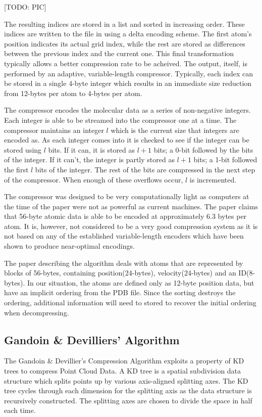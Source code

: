 \documentclass[a4paper,11pt]{report}
\begin{document}
[TODO: PIC] 

The resulting indices are stored in a list and sorted in increasing order. These indices are written to the file in using a delta encoding scheme. The first atom's position indicates its actual grid index, while the rest are stored as differences between the previous index and the current one. This final transformation typically allows a better compression rate to be acheived. The output, itself, is performed by an adaptive, variable-length compressor. Typically, each index can be stored in a single 4-byte integer which results in an immediate size reduction from 12-bytes per atom to 4-bytes per atom. 

The compressor encodes the molecular data as a series of non-negative integers. Each integer is able to be streamed into the compressor one at a time. The compressor maintains an integer $l$ which is the current size that integers are encoded as. As each integer comes into it is checked to see if the integer can be stored using $l$ bits. If it can, it is stored as $l+1$ bits; a 0-bit followed by the bits of the integer. If it can't, the integer is partly stored as $l+1$ bits; a 1-bit followed the first $l$ bits of the integer. The rest of the bits are compressed in the next step of the compressor. When enough of these overflows occur, $l$ is incremented.

The compressor was designed to be very computationally light as computers at the time of the paper were not as powerful as current machines. The paper claims that 56-byte atomic data is able to be encoded at approximately 6.3 bytes per atom. It is, however, not considered to be a very good compression system as it is not based on any of the established variable-length encoders which have been shown to produce near-optimal encodings.

The paper describing the algorithm deals with atoms that are represented by blocks of 56-bytes, containing position(24-bytes), velocity(24-bytes) and an ID(8-bytes). In our situation, the atoms are defined only as 12-byte position data, but have an implicit ordering from the PDB file. Since the sorting destroys the ordering, additional information will need to stored to recover the initial ordering when decompressing.

\subsection{Gandoin \& Devilliers' Algorithm}

The Gandoin \& Devillier's Compression Algorithm exploits a property of KD trees to compress Point Cloud Data.\cite{devillers2000gci} A KD tree is a spatial subdivision data structure which splits points up by various axis-aligned splitting axes. The KD tree cycles through each dimension for the splitting axis as the data structure is recursively constructed. The splitting axes are chosen to divide the space in half each time.
\end{document}
